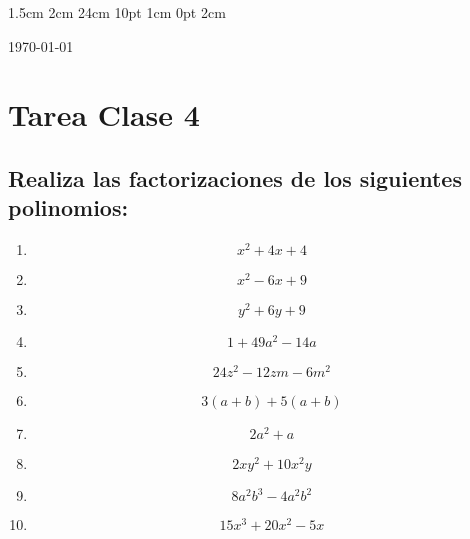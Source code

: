 \documentclass[12pt,letterpaper]{report}
\begin{document}
\setmargins{2.5cm}      
{1.5cm}                     
{2cm}  
{24cm}                    
{10pt}                          
{1cm}                          
{0pt}                             
{2cm}
\begin{flushright}
\today
\end{flushright}
\vspace{-1.75cm}
\section*{Tarea Clase 4}
\subsection*{Realiza las factorizaciones de los siguientes polinomios:}
\begin{enumerate}
\item \begin{equation*}
    x^2+4x+4
\end{equation*}
\item \begin{equation*}
    x^2-6x+9
\end{equation*}
\item \begin{equation*}
    y^2+6y+9
\end{equation*}
\item \begin{equation*}
1+49a^2-14a    
\end{equation*}
\item \begin{equation*}
24z^2-12zm-6m^2
\end{equation*}
\item \begin{equation*}
3(a+b)+5(a+b)
\end{equation*}
\item \begin{equation*}
2a^2+a    
\end{equation*}
\item \begin{equation*}
    2xy^2+10x^2y
\end{equation*}
\item \begin{equation*}
    8a^2b^3-4a^2b^2
\end{equation*}
\item \begin{equation*}
    15x^3+20x^2-5x
\end{equation*}
\end{enumerate}
\end{document}
